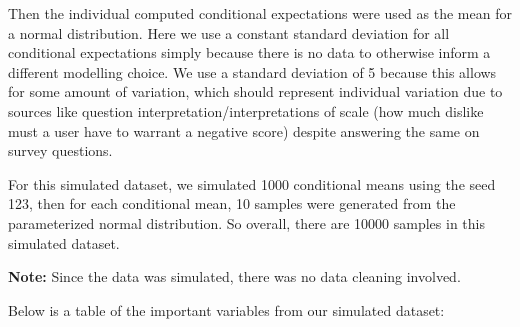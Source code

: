 \documentclass[
]{article}
\begin{document}
Then the individual computed conditional expectations were used as the
mean for a normal distribution. Here we use a constant standard
deviation for all conditional expectations simply because there is no
data to otherwise inform a different modelling choice. We use a standard
deviation of 5 because this allows for some amount of variation, which
should represent individual variation due to sources like question
interpretation/interpretations of scale (how much dislike must a user
have to warrant a negative score) despite answering the same on survey
questions.

For this simulated dataset, we simulated 1000 conditional means using
the seed 123, then for each conditional mean, 10 samples were generated
from the parameterized normal distribution. So overall, there are 10000
samples in this simulated dataset.

\textbf{Note:} Since the data was simulated, there was no data cleaning
involved.

Below is a table of the important variables from our simulated dataset:
\end{document}
